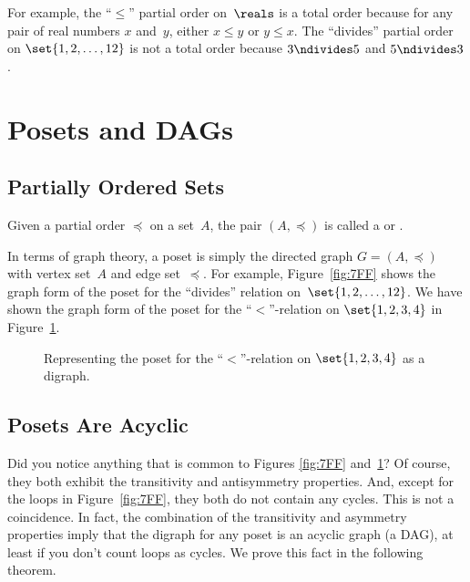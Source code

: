 For example, the ``$\le$'' partial order on~$\reals$ is a total order
because for any pair of real numbers $x$ and~$y$, either $x \le y$ or
$y \le x$.  The ``divides'' partial order on $\set{1, 2, \dots, 12}$
is not a total order because $3 \ndivides 5$ and $5 \ndivides 3$.

\section{Posets and DAGs}

\subsection{Partially Ordered Sets}

\begin{definition}\label{def:poset}
Given a partial order $\preceq$ on a set~$A$, the pair $(A, \preceq)$
is called a  or .
\end{definition}

In terms of graph theory, a poset is simply the directed graph $G =
(A, \preceq)$ with vertex set~$A$ and edge set~$\preceq$.  For example,
Figure~\ref{fig:7FF} shows the graph form of the poset for the
``divides'' relation on~$\set{1, 2, \dots, 12}$.  We have shown the
graph form of the poset for the ``$<$''-relation on $\set{1, 2, 3, 4}$
in Figure~\ref{fig:7FH}.

\begin{figure}



\caption{Representing the poset for the ``$<$''-relation on $\set{1,
    2, 3, 4}$ as a digraph.}

\label{fig:7FH}

\end{figure}

\subsection{Posets Are Acyclic}

Did you notice anything that is common to Figures \ref{fig:7FF}
and~\ref{fig:7FH}?  Of course, they both exhibit the transitivity and
antisymmetry properties.  And, except for the loops in
Figure~\ref{fig:7FF}, they both do not contain any cycles.  This is
not a coincidence.  In fact, the combination of the transitivity and
asymmetry properties imply that the digraph for any poset is an
acyclic graph (\ie a DAG), at least if you don't count loops as
cycles.  We prove this fact in the following theorem.

